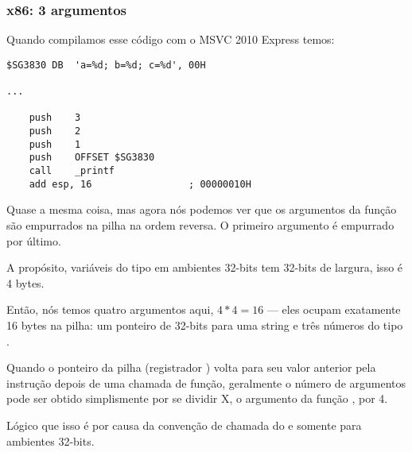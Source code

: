 \subsubsection{x86: 3 argumentos}


Quando compilamos esse código com o MSVC 2010 Express temos:

\begin{lstlisting}[style=customasmx86]
$SG3830	DB	'a=%d; b=%d; c=%d', 00H

...

	push	3
	push	2
	push	1
	push	OFFSET $SG3830
	call	_printf
	add	esp, 16					; 00000010H
\end{lstlisting}

Quase a mesma coisa, mas agora nós podemos ver que os argumentos da função \printf são empurrados na pilha na ordem reversa. O primeiro argumento é empurrado por último.

A propósito, variáveis do tipo \Tint em ambientes 32-bits tem 32-bits de largura, isso é 4 bytes.

Então, nós temos quatro argumentos aqui, $4*4=16$ --- eles ocupam exatamente 16 bytes na pilha: um ponteiro de 32-bits para uma string e três números do tipo \Tint.

Quando o ponteiro da pilha (registrador \ESP) volta para seu valor anterior pela instrução  depois de uma chamada de função,
geralmente o número de argumentos pode ser obtido simplismente por se dividir X, o argumento da função \ADD, por 4.

Lógico que isso é por causa da convenção de chamada do  e somente para ambientes 32-bits.


